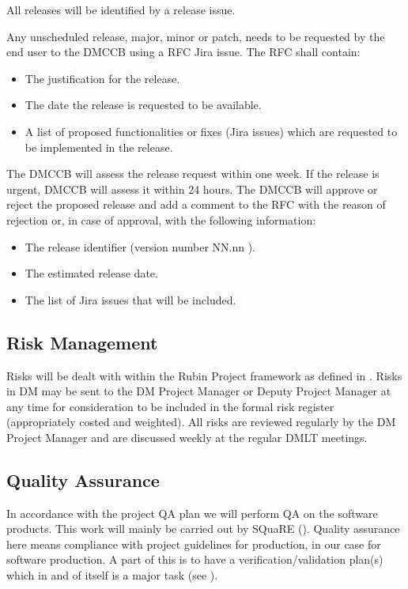 All releases will be identified by a release issue.

Any unscheduled release, major, minor or \gls{patch}, needs to be requested by the end user to the  DMCCB using a RFC  Jira issue. The RFC  shall contain:

\begin{itemize}
\item The justification for the release.
\item The date the release is requested to be available.
\item A list of proposed functionalities or fixes (Jira issues) which are requested to be implemented in the release.
\end{itemize}

The  DMCCB will assess the release request within one week. If the release is urgent,  DMCCB will assess it within 24 hours.
The  DMCCB will approve or reject the proposed release and add a comment to the RFC  with the reason of rejection or, in case of approval, with the following information:

\begin{itemize}
\item The release identifier (version number NN.nn ).
\item The estimated release date.
\item The list of Jira issues that will be included.
\end{itemize}


\subsection {Risk Management } \label{sect:risk}

Risks will be dealt with within the Rubin Project framework as defined in .
Risks in DM may be sent to the DM \gls{Project Manager} or Deputy \gls{Project Manager} at any time for consideration to be included in the formal risk register (appropriately costed and weighted).
All risks are reviewed regularly by the DM \gls{Project Manager} and are discussed weekly at the regular DMLT  meetings.


\subsection {Quality Assurance  } \label{sect:pa}

In accordance with the project \gls{QA} plan  we will perform \gls{QA} on the software products.
This work will mainly be carried out by \gls{SQuaRE} ().
Quality assurance here means compliance with project guidelines for production, in our case for software production.
A part of this is to have a verification/validation plan(s) which in and of itself is a major task (see ).


